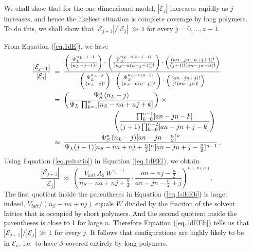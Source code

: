 \documentclass[12pt]{article}
\begin{document}
We shall show that for the one-dimensional model, $|\mathcal{E}_j|$ increases rapidly as $j$ increases,
and hence the likeliest situation is complete coverage by long polymers.  To do this, we shall show that
$|\mathcal{E}_{j+1}|/|\mathcal{E}_j| \,\gg\,1$ for every $j=0,\ldots,a-1$.

From Equation (\ref{eq.1dE}), we have
\begin{align}
   \nonumber
    \frac{|\mathcal{E}_{j+1}|}{|\mathcal{E}_j|} \; & =\;   
    \frac{
     \left(\frac{\Psi_L^{n_{L}-j-1}}{(n_L-j-1)!}\right)\cdot\left(\frac{\Psi_S^{n_S-n(a-j-1)}}{
    (n_S-n(a-j-1))!}\right) \cdot\left( \frac{ (an-jn-n+j+1)!}{(j+1)!(an-jn-n)!} \right)
      }{
 \left(\frac{\Psi_L^{n_{L}-j}}{(n_L-j)!}\right)\cdot\left(\frac{\Psi_S^{n_S-n(a-j)}}{
    (n_S-n(a-j))!}\right) \cdot   \left( \frac{ (an-jn+j)!}{j!(an-jn)!} \right)    }
    \\
    \nonumber
    & = \;   \left( \frac{\Psi_S^n \,(n_L-j) }{\Psi_L \, \prod_{k=1}^n[n_S-na+nj+k]  }\right)  \,\times 
     \\
     \nonumber
    & \hspace{31mm}  \left(   \frac{  \prod_{k=0}^{n-1}[an-jn-k]    }{(j+1)  \prod_{k=0}^{n-2} [an-jn+j-k]   }\right)
    \\
    \label{eq.1dEE}
      & \approx \;   \frac{ \Psi_S^n \,(n_L-j) [an-jn-\frac{n}{2}]^n
         }{   \Psi_L (j+1)  [n_S-na+nj+\frac{n}{2}]^n  [an-jn+j-\frac{n}{2}]^{n-1} }   \,.
\end{align}
Using Equation (\ref{eq.psiratio}) in 
 Equation (\ref{eq.1dEE}), we obtain 
\begin{equation}
   \label{eq.1dEEb}  
    \frac{|\mathcal{E}_{j+1}|}{|\mathcal{E}_j|} \; \approx  \;   
      \left(   \frac{ V_{latt}\, A_3 \,W^{\gamma_3-1} }{n_S-na+nj+\frac{n}{2}} \cdot 
         \frac{ an-nj-\frac{n}{2} }{an-jn-\frac{n}{2}+j}   \right)^{n+o(n)}.
\end{equation}
The first quotient inside the parentheses in Equation (\ref{eq.1dEEb}) is large:  indeed,
$V_{latt}/(n_S-na+nj)$ equals $W$ divided by the fraction of the solvent lattice that is occupied by 
short polymers.  
And the second quotient inside the parentheses is close to 1 for large $n$.   Therefore 
Equation (\ref{eq.1dEEb}) tells us that $|\mathcal{E}_{j+1}|/|\mathcal{E}_j| \,\gg\,1$
for every $j$.  It follows that configurations are highly likely to be in $\mathcal{E}_a$, i.e.\
to have $\mathcal{S}$ covered entirely by long polymers.
\end{document}
